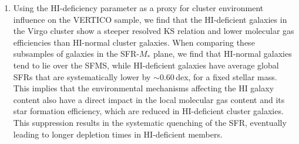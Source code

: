 \documentclass[longauth]{aa}
\begin{document}
\begin{enumerate}
    \item Using the HI-deficiency parameter as a proxy for cluster environment influence on the VERTICO sample, we find that the HI-deficient galaxies in the Virgo cluster show a steeper resolved KS relation and lower molecular gas efficiencies than HI-normal cluster galaxies. When comparing these subsamples of galaxies in the SFR-$M_*$ plane, we find that HI-normal galaxies tend to lie over the SFMS, while HI-deficient galaxies have average global SFRs that are systematically lower by $\sim$0.60\,dex, for a fixed stellar mass. This implies that the environmental mechanisms affecting the HI galaxy content also have a direct impact in the local molecular gas content and its star formation efficiency, which are reduced in HI-deficient cluster galaxies. This suppression results in the systematic quenching of the SFR, eventually leading to longer depletion times in HI-deficient members.
    
\end{enumerate}
    




\end{document}
